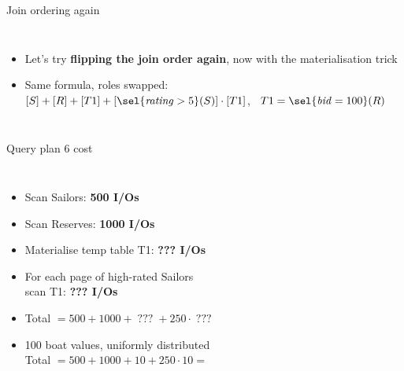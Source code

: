 \begin{frame}{Join ordering again }
  \begin{columns}[c]
      \begin{itemize}
        \item Let's try \textbf{flipping the join order again}, now with the materialisation trick
        \item Same formula, roles swapped: \\
              $[S] + [R] + [T1] + [\sel{\mathit{rating}>5}(S)]\cdot[T1]$, \ $T1 = \sel{\mathit{bid}=100}(R)$
      \end{itemize}
      \planbox{52mm}{\PlanFive}\centering{}
  \end{columns}
\end{frame}

\begin{frame}{Query plan 6 cost }
  \begin{columns}[c]
      \begin{itemize}
        \item Scan Sailors: \textbf{500 I/Os}
        \item Scan Reserves: \textbf{1000 I/Os}
        \item Materialise temp table T1: \textbf{??? I/Os}
        \item For each page of high-rated Sailors\\ scan T1: \textbf{??? I/Os}
        \item Total $= 500 + 1000 + \;???\; + 250 \cdot \;???$
        \item 100 boat values, uniformly distributed\\
              Total $= 500 + 1000 + 10 + 250 \cdot 10 =$ 
      \end{itemize}
      \planbox[hl]{60mm}{\PlanSix}
  \end{columns}
\end{frame}



